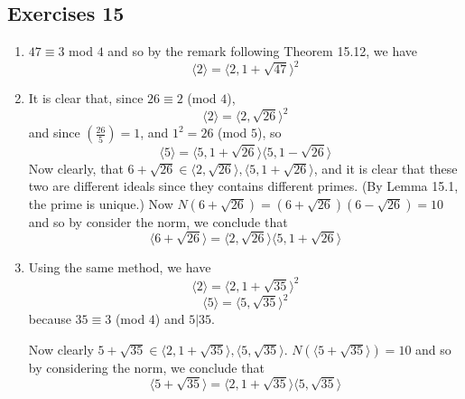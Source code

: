 \subsection{Exercises 15}
\begin{enumerate}
\item $47 \equiv 3$ mod $4$ and so by the remark following Theorem 15.12, we have
$$\langle 2 \rangle =\langle 2,1+\sqrt{47} \rangle^2$$
\item It is clear that, since $26 \equiv 2$ (mod $4$),
$$\langle 2 \rangle=\langle 2,\sqrt{26} \rangle^2$$
and since $(\frac{26}{5})=1$, and $1^2=26$ (mod $5$), so
$$\langle 5 \rangle=\langle 5, 1+\sqrt{26} \rangle \langle 5,1-\sqrt{26} \rangle$$
Now clearly, that $6+\sqrt{26} \in \langle 2,\sqrt{26} \rangle, \langle 5,1+\sqrt{26} \rangle$, and it is clear
that these two are different ideals since they contains different primes. (By Lemma 15.1, the prime is unique.)
Now $N(6+\sqrt{26})=(6+\sqrt{26})(6-\sqrt{26})=10$ and so by consider the norm, we conclude that
$$\langle 6+\sqrt{26} \rangle =\langle 2,\sqrt{26} \rangle \langle 5,1+\sqrt{26} \rangle$$
\item Using the same method, we have
$$\langle 2 \rangle=\langle 2,1+\sqrt{35} \rangle^2$$
$$\langle 5 \rangle=\langle 5,\sqrt{35} \rangle^2$$
because $35 \equiv 3$ (mod $4$) and $5|35$.

Now clearly $5+\sqrt{35} \in \langle 2,1+\sqrt{35} \rangle, \langle 5,\sqrt{35} \rangle$.
$N(\langle 5+\sqrt{35} \rangle)=10$ and so by considering the norm, we conclude that
$$\langle 5+\sqrt{35} \rangle =\langle 2,1+\sqrt{35} \rangle \langle 5,\sqrt{35} \rangle$$


\end{enumerate}
